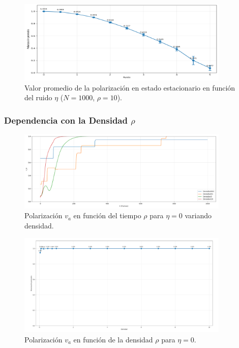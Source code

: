 \documentclass{article}
\begin{document}
\begin{figure}[H]
\centering
\includegraphics[width=0.9\textwidth]{promedio_polarizacion_ruido_promedio2.png}
\caption{Valor promedio de la polarización en estado estacionario en función del ruido $\eta$ ($N = 1000$, $\rho = 10$).}
\label{fig:promedio_va_eta_promedio2}
\end{figure}

\subsubsection{Dependencia con la Densidad $\rho$}
\begin{figure}[H]
\centering
\includegraphics[width=0.9\textwidth]{17.png}
\caption{Polarización $v_a$ en función del tiempo $\rho$ para $\eta = 0$ variando densidad.}
\label{fig:17}
\end{figure}

\begin{figure}[H]
\centering
\includegraphics[width=0.9\textwidth]{18.png}
\caption{Polarización $v_a$ en función de la densidad $\rho$ para $\eta = 0$.}
\label{fig:18}
\end{figure}
\end{document}
